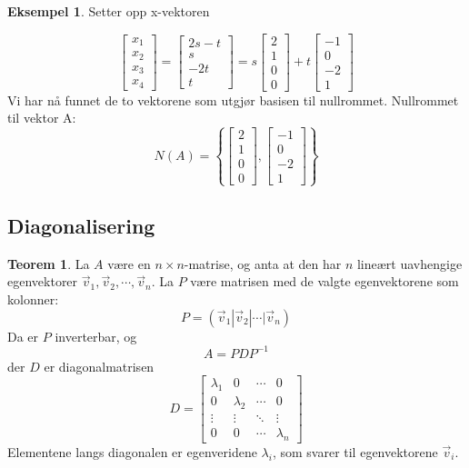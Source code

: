 \documentclass[11pt]{article}
\theoremstyle{definition}
\theoremstyle{definition}
\newtheorem{mitteks}{Eksempel}[section]
\theoremstyle{definition}
\theoremstyle{definition}
\newtheorem{teo}{Teorem}[section]
\newenvironment{fteo}
{\begin{mdframed}[style=minstil]\begin{teo}}
		{\end{teo}\end{mdframed}}
\theoremstyle{definition}
\theoremstyle{definition}
\begin{document}
\begin{mitteks}
		Setter opp x-vektoren
		
		\[\left[\begin{array}{c} 
		x_1 \\
		x_2 \\
		x_3 \\
		x_4
		\end{array} \right]=\left[\begin{array}{c} 
		2s-t\\
		s   \\
		-2t \\
		t
		\end{array} \right]=s\left[\begin{array}{c} 
		2 \\
		1 \\
		0 \\
		0
		\end{array}\right]+t\left[\begin{array}{r} 
		-1 \\
		0  \\
		-2 \\
		1		\end{array}  \right] \]
		Vi har nå funnet de to vektorene som utgjør basisen til nullrommet. Nullrommet til vektor A:
		\[N(A)=\left\lbrace\left[\begin{array}{c} 
		2 \\
		1 \\
		0 \\
		0
		\end{array}\right],\left[\begin{array}{r} 
		-1 \\
		0  \\
		-2 \\
		1		\end{array}  \right] \right\rbrace \]
		
		\end{mitteks}
		
		\newpage
		
		\subsection{Diagonalisering}
		
		\begin{fteo}
			La \(A\) være en \(n\times n \)-matrise, og anta at den har \(n\) lineært uavhengige egenvektorer \(\vec{v}_1,\vec{v}_2,\cdots,\vec{v}_n \). La \(P\) være matrisen med de valgte egenvektorene som kolonner:
			\[P=\left(\vec{v}_1|\vec{v}_2|\cdots|\vec{v}_n \right) \]
			Da er \(P\) inverterbar, og
			\[A=PDP^{-1}\]
			der \(D\) er diagonalmatrisen
			\[D=\left[\begin{array}{cccc} 
			\lambda_1 & 0 & \cdots & 0 \\
			0 & \lambda_2 & \cdots & 0 \\
			\vdots & \vdots & \ddots & \vdots \\
			0 & 0 & \cdots & \lambda_n
			\end{array} \right]\]
			Elementene langs diagonalen er egenveridene \(\lambda_i \), som svarer til egenvektorene \(\vec{v}_i \).
		\end{fteo}
		
\end{document}
